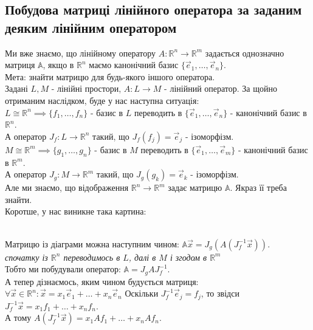 \documentclass[a4paper, 10pt]{article}
\theoremstyle{theoremdd}
\begin{document}
\subsection{Побудова матриці лінійного оператора за заданим деяким лінійним оператором}
	Ми вже знаємо, що лінійному оператору $A \colon \mathbb{R}^n \to \mathbb{R}^m$ задається однозначно матриця $\mathbb{A}$, якщо в $\mathbb{R}^n$ маємо канонічний базис $\{\vec{e}_1,\dots,\vec{e}_n \}$.\\
	Мета: знайти матрицю для будь-якого іншого оператора.
	\bigskip \\
	Задані $L,M$ - лінійні простори, $A \colon L \to M$ - лінійний оператор. За щойно отриманим наслідком, буде у нас наступна ситуація:\\
	$L \cong \mathbb{R}^n \implies \{f_1,\dots,f_n\}$ - базис в $L$ переводить в $\{\vec{e}_1,\dots,\vec{e}_n\}$ - канонічний базис в $\mathbb{R}^n$. \\ 
	А оператор $J_f \colon L \to \mathbb{R}^n$ такий, що $J_f(f_j) = \vec{e}_j$ - ізоморфізм.
	\bigskip \\
	$M \cong \mathbb{R}^m \implies \{g_1,\dots,g_n\}$ - базис в $M$ переводить в $\{\vec{e}_1,\dots,\vec{e}_m\}$ - канонічний базис в $\mathbb{R}^m$. \\
	А оператор $J_g \colon M \to \mathbb{R}^m$ такий, що $J_g(g_k) = \vec{e}_k$ - ізоморфізм.\\
	Але ми знаємо, що відображення $\mathbb{R}^n \to \mathbb{R}^m$ задає матрицю $\mathbb{A}$. Якраз її треба знайти.
	\\
	Коротше, у нас виникне така картина:\\
	\\
	Матрицю із діаграми можна наступним чином: $\mathbb{A}\vec{x} = J_g(A(J^{-1}_f\vec{x}))$.\\
	\textit{спочатку із $\mathbb{R}^n$ переводимось в $L$, далі в $M$ і згодом в $\mathbb{R}^m$}\\
	Тобто ми побудували оператор: $\mathbb{A} = J_g A J_f^{-1}$.\\
	А тепер дізнаємось, яким чином будується матриця:\\
	$\forall \vec{x} \in \mathbb{R}^n: \vec{x} = x_1 \vec{e}_1+ \dots + x_n \vec{e}_n$
	Оскільки $J_f^{-1} \vec{e}_j = f_j$, то звідси $J_f^{-1} \vec{x} = x_1f_1+\dots+x_nf_n$. \\ А тому $A(J_f^{-1}\vec{x}) = x_1Af_1 + \dots + x_nAf_n$.\\
\end{document}
